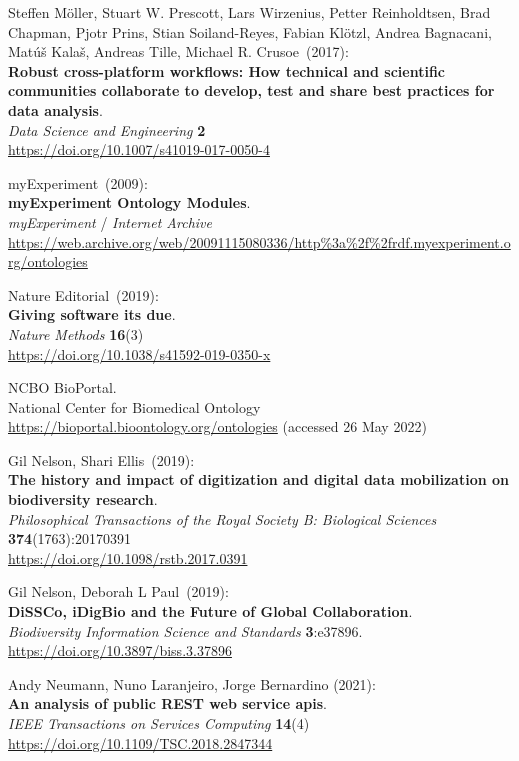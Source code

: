 \begin{thebibliography}{9}
Steffen Möller, Stuart W. Prescott, Lars Wirzenius, Petter
Reinholdtsen, Brad Chapman, Pjotr Prins, Stian Soiland-Reyes, Fabian
Klötzl, Andrea Bagnacani, Matúš Kalaš, Andreas Tille, Michael R. Crusoe~(2017):\\
\textbf{Robust cross-platform workflows: How technical and scientific
communities collaborate to develop, test and share best practices for
data analysis}.\\
\emph{Data Science and Engineering} \textbf{2}\\
\url{https://doi.org/10.1007/s41019-017-0050-4}

myExperiment~(2009):\\
\textbf{myExperiment Ontology Modules}.\\
\emph{myExperiment} / \emph{Internet Archive}\\
\url{https://web.archive.org/web/20091115080336/http\%3a\%2f\%2frdf.myexperiment.org/ontologies}

Nature Editorial~(2019):\\
\textbf{Giving software its due}.\\
\emph{Nature Methods} \textbf{16}(3)\\
\url{https://doi.org/10.1038/s41592-019-0350-x}

NCBO BioPortal.\\
National Center for Biomedical Ontology \\
\url{https://bioportal.bioontology.org/ontologies} (accessed 26 May
2022)

Gil Nelson, Shari Ellis~(2019):\\
\textbf{The history and impact of digitization and digital data mobilization on
biodiversity research}.\\
\emph{Philosophical Transactions of the Royal Society B: Biological Sciences}
\textbf{374}(1763):20170391\\
\url{https://doi.org/10.1098/rstb.2017.0391}

Gil Nelson, Deborah L Paul~(2019):\\
\textbf{DiSSCo, iDigBio and the Future of Global Collaboration}.\\
\emph{Biodiversity Information Science and Standards}
\textbf{3}:e37896.\\
\url{https://doi.org/10.3897/biss.3.37896}

Andy Neumann, Nuno Laranjeiro, Jorge Bernardino (2021): \\
\textbf{An analysis of public {REST} web service apis}.\\
\emph{IEEE Transactions on Services Computing} \textbf{14}(4)\\
\url{https://doi.org/10.1109/TSC.2018.2847344}


\end{thebibliography}
